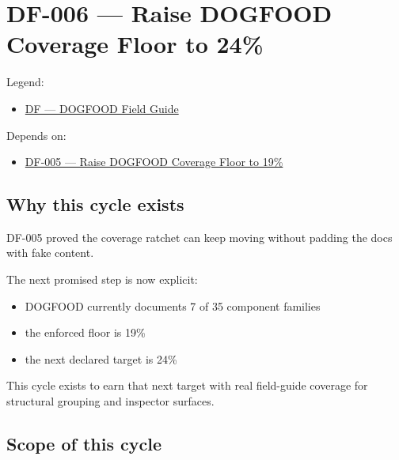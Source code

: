 \chapter{DF-006 --- Raise DOGFOOD Coverage Floor to 24\%}\label{record-068}

\smallskip

Legend:

\begin{itemize}
\tightlist
\item
  \href{https://github.com/flyingrobots/bijou/blob/1853ad902f6bf219326409e7f743a5a1d6517dbc/docs/legends/DF-dogfood-field-guide.md}{DF --- DOGFOOD Field Guide}
\end{itemize}

Depends on:

\begin{itemize}
\tightlist
\item
  \href{https://github.com/flyingrobots/bijou/blob/cbd70612140e7a450d764b3c7be1c6af878b99bc/docs/design/DF-005-raise-dogfood-coverage-floor-to-19-percent.md}{DF-005 --- Raise DOGFOOD Coverage Floor to 19\%}
\end{itemize}

\section{Why this cycle exists}\label{record-068-why-this-cycle-exists}

DF-005 proved the coverage ratchet can keep moving without padding the docs with fake content.

The next promised step is now explicit:

\begin{itemize}
\tightlist
\item
  DOGFOOD currently documents 7 of 35 component families
\item
  the enforced floor is 19\%
\item
  the next declared target is 24\%
\end{itemize}

This cycle exists to earn that next target with real field-guide coverage for structural grouping and inspector surfaces.

\section{Scope of this cycle}\label{record-068-scope-of-this-cycle}

